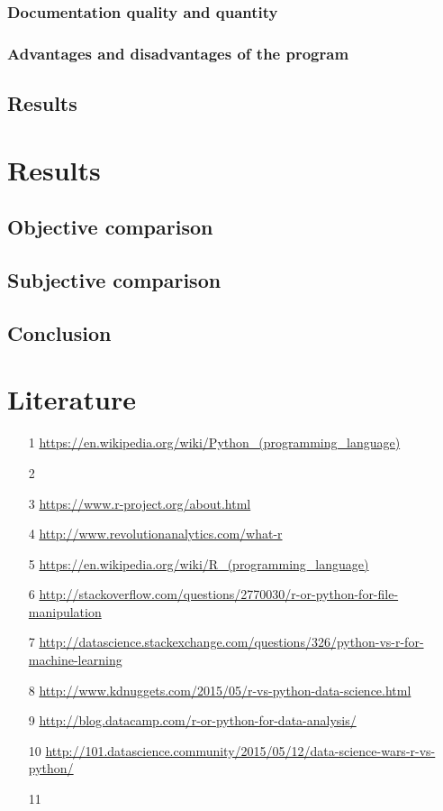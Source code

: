 \documentclass{article}
\begin{document}
\subsubsection{Documentation quality and quantity}
\subsubsection{Advantages and disadvantages of the program}
\subsection{Results}

\newpage
\section{Results}
\subsection{Objective comparison}
\subsection{Subjective comparison}
\subsection{Conclusion}

\newpage
\section{Literature}
\begin{enumerate}
    \item[1] \url{https://en.wikipedia.org/wiki/Python_(programming_language)}
    \item[2]
    \item[3] \url{https://www.r-project.org/about.html}
    \item[4] \url{http://www.revolutionanalytics.com/what-r}
    \item[5] \url{https://en.wikipedia.org/wiki/R_(programming_language)}
    \item[6] \url{http://stackoverflow.com/questions/2770030/r-or-python-for-file-manipulation}
    \item[7] \url{http://datascience.stackexchange.com/questions/326/python-vs-r-for-machine-learning}
    \item[8] \url{http://www.kdnuggets.com/2015/05/r-vs-python-data-science.html}
    \item[9] \url{http://blog.datacamp.com/r-or-python-for-data-analysis/}
    \item[10] \url{http://101.datascience.community/2015/05/12/data-science-wars-r-vs-python/}
    \item[11]
\end{enumerate}
\end{document}
